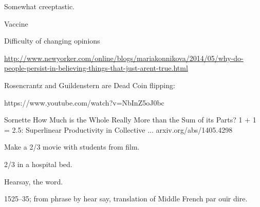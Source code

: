 \begin{comment}
  \textbf{Other pieces:}

  
  
    Goodness: $A^{\textnormal{T}} K^{-1}$ is similar to a real symmetric matrix
    if $A = A^{\textnormal{T}}$.
  
    Consider the transformation $M = \alertb{K^{-1/2}}$:
    $$
    \alertb{K^{-1/2}}
    \alert{A^{\textnormal{T}} K^{-1}}
    \alertb{K^{1/2}}
    =
    \alertb{K^{-1/2}}
    \alert{A^{\textnormal{T}}}
    \alertb{K^{-1/2}}.
    $$
  
    Since $A^{\textnormal{T}} = A$, we 
    have 
    $$
    ({K^{-1/2}}
    {A}
    {K^{-1/2}})^{\textnormal{T}}
    =
    {K^{-1/2}}
    {A}
    {K^{-1/2}}.
    $$
  
    Upshot: $A^{\textnormal{T}} K^{-1} = A K^{-1}$ has real eigenvalues and a complete
    set of orthogonal eigenvectors.
  
    Can also show that maximum eigenvalue magnitude is indeed 1.
  
    Other goodies: next time round.
  




\end{comment}

  
  Somewhat creeptastic.


Vaccine

Difficulty of changing opinions

\url{http://www.newyorker.com/online/blogs/mariakonnikova/2014/05/why-do-people-persist-in-believing-things-that-just-arent-true.html}




Rosencrantz and Guildenstern are Dead  
Coin flipping:

https://www.youtube.com/watch?v=NbInZ5oJ0bc



  
Sornette
How Much is the Whole Really More than the Sum of its Parts? 1 + 1 = 2.5: Superlinear Productivity in Collective ...
arxiv.org/abs/1405.4298



  Make a 2/3 movie with students from film.

  2/3 in a hospital bed.

  Hearsay, the word.

1525–35; from phrase by hear say, translation of Middle French par ouïr dire.

